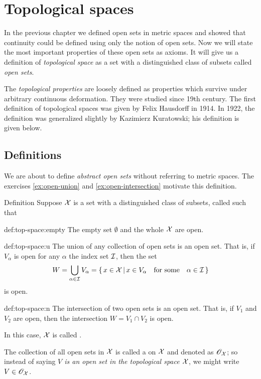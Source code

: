 \chapter{Topological spaces}


In the previous chapter we defined open sets in metric spaces 
and showed that continuity could be defined using only the notion of open sets.
Now we will state the most important properties of these open sets as axioms.
It will give us a definition of \emph{topological space} as a set with a distinguished class of subsets called \emph{open sets}.

The \emph{topological properties} are loosely defined as properties which survive under arbitrary continuous deformation.
They were studied since 19th century.
The first definition of topological spaces was given by Felix Hausdorff in 1914.
In 1922, the definition was generalized slightly by Kazimierz Kuratowski; his definition is given below.

\section{Definitions}

We are about to define \emph{abstract open sets} without referring to metric spaces.
The exercises \ref{ex:open-union} and \ref{ex:open-intersection} motivate this definition.

\begin{thm}{Definition}\label{def:top-space}
Suppose $\mathcal{X}$ is a set 
with a distinguished class of subsets, called  such that

\begin{subthm}{def:top-space:empty}
The empty set $\emptyset$ and the whole $\mathcal{X}$ are open.
\end{subthm}

\begin{subthm}{def:top-space:u}
The union of any collection of open sets is an open set.
That is, if $V_\alpha$ is open for any $\alpha$ the index set $\mathcal{I}$, 
then the set
\[W=\bigcup_{\alpha\in \mathcal{I}} V_\alpha
=
\left\{\,{x\in \mathcal{X}}\,\middle|\,{x\in V_\alpha\quad\text{for some}\quad\alpha\in \mathcal{I}}\,\right\}\]
is open.
\end{subthm}

\begin{subthm}{def:top-space:n}
The intersection of two open sets is an open set.  
That is, if $V_1$ and $V_2$ are open, then the intersection $W=V_1 \cap V_2$ is open. 
\end{subthm}

In this case, $\mathcal{X}$ is called .

The collection of all open sets in  $\mathcal{X}$ is called a  on $\mathcal{X}$ and denoted as $\mathscr{O}_{\mathcal{X}}$;
so instead of saying \emph{$V$ is an open set in the topological space $\mathcal{X}$}, we might write $V\in \mathscr{O}_{\mathcal{X}}$.
\end{thm}

